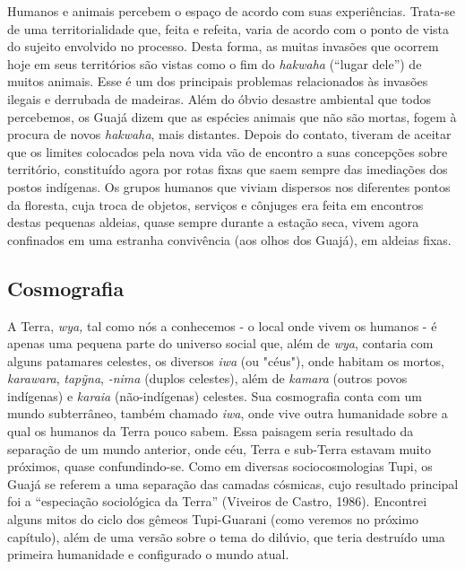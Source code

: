 Humanos e animais percebem o espaço de acordo com suas experiências.
Trata-se de uma territorialidade que, feita e refeita, varia de acordo
com o ponto de vista do sujeito envolvido no processo. Desta forma, as
muitas invasões que ocorrem hoje em seus territórios são vistas como o
fim do \emph{hakwaha} (``lugar dele'') de muitos animais. Esse é um dos
principais problemas relacionados às invasões ilegais e derrubada de
madeiras. Além do óbvio desastre ambiental que todos percebemos, os
Guajá dizem que as espécies animais que não são mortas, fogem à procura
de novos \emph{hakwaha}, mais distantes. Depois do contato, tiveram de
aceitar que os limites colocados pela nova vida vão de encontro a suas
concepções sobre território, constituído agora por rotas fixas que saem
sempre das imediações dos postos indígenas. Os grupos humanos que viviam
dispersos nos diferentes pontos da floresta, cuja troca de objetos,
serviços e cônjuges era feita em encontros destas pequenas aldeias,
quase sempre durante a estação seca, vivem agora confinados em uma
estranha convivência (aos olhos dos Guajá), em aldeias fixas.

\hypertarget{cosmografia}{%
\subsection{Cosmografia}\label{cosmografia}}

A Terra, \emph{wya,} tal como nós a conhecemos - o local onde vivem os
humanos - é apenas uma pequena parte do universo social que, além de
\emph{wya}, contaria com alguns patamares celestes, os diversos
\emph{iwa} (ou "céus"), onde habitam os mortos, \emph{karawara},
\emph{tapỹna}, \emph{-nima} (duplos celestes), além de \emph{kamara}
(outros povos indígenas) e \emph{karaia} (não-indígenas) celestes. Sua
cosmografia conta com um mundo subterrâneo, também chamado \emph{iwa},
onde vive outra humanidade sobre a qual os humanos da Terra pouco sabem.
Essa paisagem seria resultado da separação de um mundo anterior, onde
céu, Terra e sub-Terra estavam muito próximos, quase confundindo-se.
Como em diversas sociocosmologias Tupi, os Guajá se referem a uma
separação das camadas cósmicas, cujo resultado principal foi a
``especiação sociológica da Terra'' (Viveiros de Castro, 1986).
Encontrei alguns mitos do ciclo dos gêmeos Tupi-Guarani (como veremos no
próximo capítulo), além de uma versão sobre o tema do dilúvio, que teria
destruído uma primeira humanidade e configurado o mundo atual.

